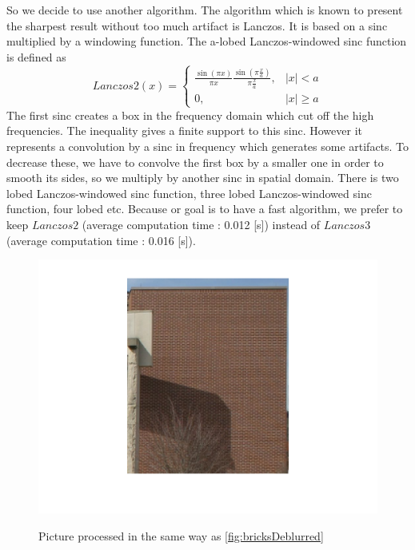 So we decide to use another algorithm. The algorithm which is known to present %
the sharpest result without too much artifact is Lanczos. It is based on a sinc multiplied by a windowing function. The a-lobed Lanczos-windowed sinc function is defined as 
\[
Lanczos2(x) = 
\left\{  \begin{array}{cc}
\frac{\sin(\pi x )}{\pi x} \frac{\sin (\pi \frac{x}{a}) }{\pi \frac{x}{a}}, & |x| < a\\
0, & |x| \geq a
\end{array} \right. \]
The first sinc creates a box in the frequency domain which cut off the high frequencies. The inequality gives a finite support to this sinc. However it represents a convolution by a sinc in frequency which generates some artifacts. To decrease these, we have to convolve the first box by a smaller one in order to smooth its sides, so we multiply by another sinc in spatial domain. 
There is two lobed Lanczos-windowed sinc function, three lobed Lanczos-windowed sinc function, four lobed etc. Because or goal is to have a fast algorithm, we prefer to keep $Lanczos2$ (average computation time :  0.012 [s]) instead of $Lanczos3$ (average computation time : 0.016 [s]). 


\begin{figure}
\centering
\includegraphics[width=\textwidth]{../Images/bricksLanczos.png}
\label{fig:bricksLanczos}
\caption{Picture processed in the same way as \ref{fig:bricksDeblurred} }
\end{figure}
%



 